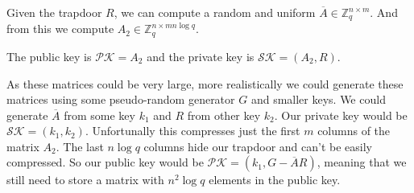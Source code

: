 \documentclass[a4paper]{article}
\begin{document}
Given the trapdoor $R$, we can compute a random and uniform $\overline{A}\in \mathbb{Z}_q^{n \times m}$. And from this we compute $A_2\in\mathbb{Z}_q^{n \times mn \log q}$.

The public key is $\mathcal{PK}=A_2$ and the private key is $\mathcal{SK}=(A_2, R)$.

As these matrices could be very large, more realistically we could generate these matrices using some pseudo-random generator $G$ and smaller keys. We could generate $\overline{A}$ from some key $k_1$ and $R$ from other key $k_2$. Our private key would be $\mathcal{SK}=(k_1, k_2)$. Unfortunally this compresses just the first $m$ columns of the matrix $A_2$. The last $n \log q$ columns hide our trapdoor and can't be easily compressed. So our public key would be $\mathcal{PK}=(k_1, G-\overline{A}R)$, meaning that we still need to store a matrix with $n^2\log q$ elements in the public key.




 {}
 
\end{document}
